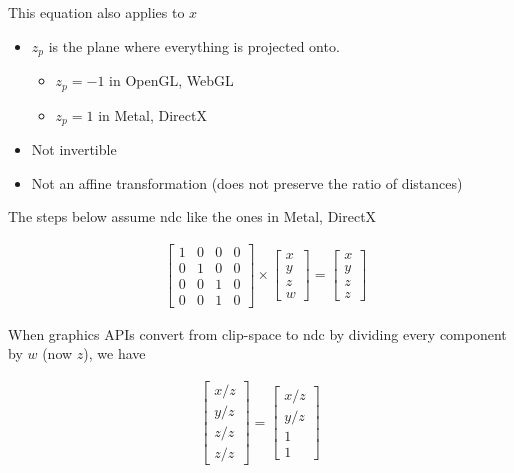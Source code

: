     This equation also applies to $ x $

    \begin{itemize}
      \item $ z_{p} $ is the plane where everything is projected onto.
      \begin{itemize}
        \item $ z_{p} = -1 $ in OpenGL, WebGL
        \item $ z_{p} = 1 $ in Metal, DirectX
      \end{itemize}
      \item Not invertible
      \item Not an affine transformation (does not preserve the ratio of
      distances)
    \end{itemize}

    The steps below assume \acrshort{ndc} like the ones in Metal, DirectX

    \begin{align*}
      &\begin{bmatrix}
        1 & 0 & 0 & 0 \\
        0 & 1 & 0 & 0 \\
        0 & 0 & 1 & 0 \\
        0 & 0 & 1 & 0
      \end{bmatrix}
      \times
      \begin{bmatrix}
        x \\
        y \\
        z \\
        w
      \end{bmatrix}
      =
      \begin{bmatrix}
        x \\
        y \\
        z \\
        z
      \end{bmatrix}
    \end{align*}

    When graphics APIs convert from \gls{clip-space} to \acrshort{ndc} by
    dividing every component by $ w $ (now $ z $), we have

    \begin{align*}
      \begin{bmatrix}
        x / z \\
        y / z \\
        z / z \\
        z / z
      \end{bmatrix}
      =
      \begin{bmatrix}
        x / z \\
        y / z \\
        1 \\
        1
      \end{bmatrix}
    \end{align*}

